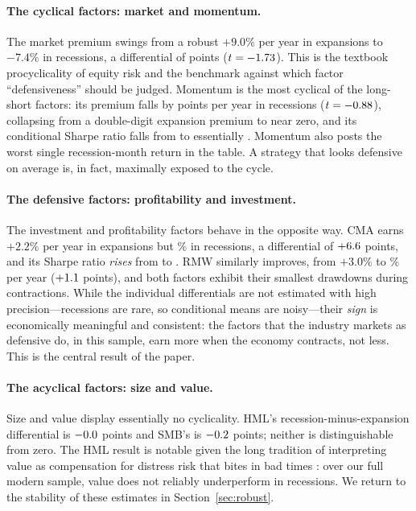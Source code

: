 \documentclass[12pt]{article}
\begin{document}
\paragraph{The cyclical factors: market and momentum.} The market premium swings
from a robust $+9.0\%$ per year in expansions to $-7.4\%$ in recessions, a
differential of \mktRecDiff{} points ($t=-1.73$). This is the textbook
procyclicality of equity risk and the benchmark against which factor
``defensiveness'' should be judged. Momentum is the most cyclical of the
long-short factors: its premium falls by \momRecDiff{} points per year in
recessions ($t=-0.88$), collapsing from a double-digit expansion premium to
near zero, and its conditional Sharpe ratio falls from \momSharpeE{} to
essentially \momSharpeR. Momentum also posts the worst single recession-month
return in the table. A strategy that looks defensive on average is, in fact,
maximally exposed to the cycle.

\paragraph{The defensive factors: profitability and investment.} The investment
and profitability factors behave in the opposite way. CMA earns $+2.2\%$ per
year in expansions but \cmaRecMean\% in recessions, a differential of
$+6.6$ points, and its Sharpe ratio \emph{rises} from \cmaSharpeE{} to
\cmaSharpeR. RMW similarly improves, from $+3.0\%$ to \rmwRecMean\% per year
($+1.1$ points), and both factors exhibit their smallest drawdowns
during contractions. While the individual differentials are not estimated with
high precision---recessions are rare, so conditional means are noisy---their
\emph{sign} is economically meaningful and consistent: the factors that the
industry markets as defensive do, in this sample, earn more when the economy
contracts, not less. This is the central result of the paper.

\paragraph{The acyclical factors: size and value.} Size and value display
essentially no cyclicality. HML's recession-minus-expansion differential is
$-0.0$ points and SMB's is $-0.2$ points; neither is
distinguishable from zero. The HML result is notable given the long tradition
of interpreting value as compensation for distress risk that bites in bad times
\citep{petkova2005value,gulen2011value}: over our full modern sample, value does
not reliably underperform in recessions. We return to the stability of these
estimates in Section~\ref{sec:robust}.
\end{document}
